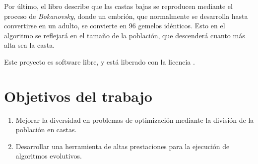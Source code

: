 Por último, el libro describe que las castas bajas se reproducen mediante el proceso de \textit{Bokanovsky}, donde un embrión, que normalmente se desarrolla hasta convertirse
en un adulto, se convierte en 96 gemelos idénticos. Esto en el algoritmo se reflejará en el tamaño de la población, que descenderá cuanto más alta sea la casta.


Este proyecto es software libre, y está liberado con la licencia \cite{gplv3}.

\section{Objetivos del trabajo}

\begin{enumerate}
    \item Mejorar la diversidad en problemas de optimización mediante la división de la población en castas.
    \item Desarrollar una herramienta de altas prestaciones para la ejecución de algoritmos evolutivos.
\end{enumerate}